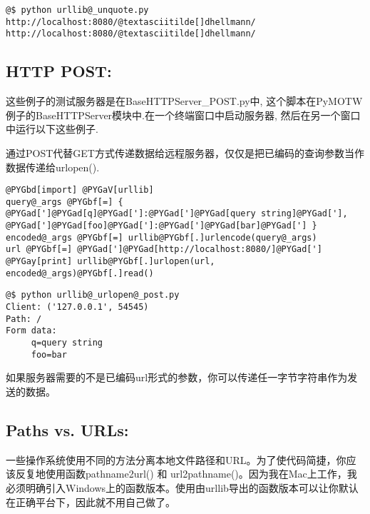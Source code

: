 \documentclass[letterpaper,10pt,english]{manual}
\begin{document}
\begin{Verbatim}[commandchars=@\[\]]
@$ python urllib@_unquote.py
http://localhost:8080/@textasciitilde[]dhellmann/
http://localhost:8080/@textasciitilde[]dhellmann/
\end{Verbatim}


\subsection{HTTP POST:}

这些例子的测试服务器是在BaseHTTPServer\_POST.py中, 这个脚本在PyMOTW例子的BaseHTTPServer模块中.在一个终端窗口中启动服务器, 然后在另一个窗口中运行以下这些例子.

通过POST代替GET方式传递数据给远程服务器，仅仅是把已编码的查询参数当作数据传递给urlopen().

\begin{Verbatim}[commandchars=@\[\]]
@PYGbd[import] @PYGaV[urllib]
query@_args @PYGbf[=] { @PYGad[']@PYGad[q]@PYGad[']:@PYGad[']@PYGad[query string]@PYGad['], @PYGad[']@PYGad[foo]@PYGad[']:@PYGad[']@PYGad[bar]@PYGad['] }
encoded@_args @PYGbf[=] urllib@PYGbf[.]urlencode(query@_args)
url @PYGbf[=] @PYGad[']@PYGad[http://localhost:8080/]@PYGad[']
@PYGay[print] urllib@PYGbf[.]urlopen(url, encoded@_args)@PYGbf[.]read()
\end{Verbatim}

\begin{Verbatim}[commandchars=@\[\]]
@$ python urllib@_urlopen@_post.py
Client: ('127.0.0.1', 54545)
Path: /
Form data:
     q=query string
     foo=bar
\end{Verbatim}

如果服务器需要的不是已编码url形式的参数，你可以传递任一字节字符串作为发送的数据。


\subsection{Paths vs. URLs:}

一些操作系统使用不同的方法分离本地文件路径和URL。为了使代码简捷，你应该反复地使用函数pathname2url() 和 url2pathname()。因为我在Mac上工作，我必须明确引入Windows上的函数版本。使用由urllib导出的函数版本可以让你默认在正确平台下，因此就不用自己做了。
\end{document}
